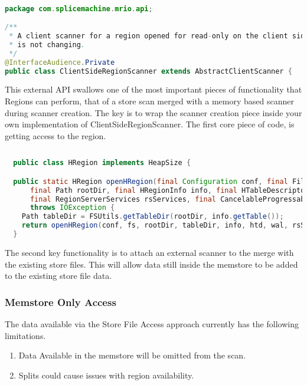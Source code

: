 \begin{lstlisting}[language=java]

package com.splicemachine.mrio.api;

/**
 * A client scanner for a region opened for read-only on the client side. Assumes region data
 * is not changing.
 */
@InterfaceAudience.Private
public class ClientSideRegionScanner extends AbstractClientScanner {

\end{lstlisting}

This external API swallows one of the most important pieces of functionality
that Regions can perform, that of a store scan merged with a memory based
scanner during scanner creation.  The key is to wrap the scanner creation piece
inside your own implementation of ClientSideRegionScanner.  The first core piece
of code, is getting access to the region.

\begin{lstlisting}[language=java]
  
  public class HRegion implements HeapSize {

  public static HRegion openHRegion(final Configuration conf, final FileSystem fs,
      final Path rootDir, final HRegionInfo info, final HTableDescriptor htd, final HLog wal,
      final RegionServerServices rsServices, final CancelableProgressable reporter)
      throws IOException {
    Path tableDir = FSUtils.getTableDir(rootDir, info.getTable());
    return openHRegion(conf, fs, rootDir, tableDir, info, htd, wal, rsServices, reporter);
  }
\end{lstlisting}

The second key functionality is to attach an external scanner to the merge with
the existing store files.  This will allow data still inside the memstore to be
added to the existing store file data.



\subsubsection{Memstore Only Access}
The data available via the Store File Access approach currently has the
following limitations.

\begin{enumerate}
	\item Data Available in the memstore will be omitted from the scan.
	\item Splits could cause issues with region availability.
\end{enumerate}

